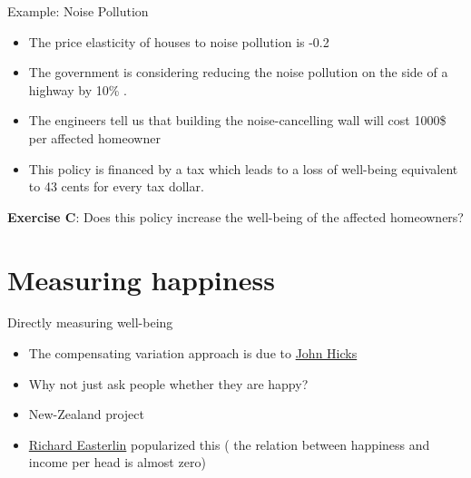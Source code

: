 \documentclass[handout]{beamer}
\begin{document}
\begin{frame}{Example: Noise Pollution}

\begin{itemize}
	\item The price elasticity of houses to noise pollution is -0.2
	\item The government is considering reducing the noise pollution on the side of a highway by 10\% .
	\item The engineers tell us that building the noise-cancelling wall will cost 1000\$ per affected homeowner
	\item This policy is financed by a tax which leads to a loss of well-being equivalent to 43 cents for every tax dollar. 
\end{itemize}
	
\textbf{Exercise C}: Does this policy increase the well-being of the affected homeowners?
\end{frame}

\section{Measuring happiness}

\begin{frame}{Directly measuring well-being}

\begin{itemize}
\item The compensating variation approach is due to \href{https://fr.wikipedia.org/wiki/John_Hicks}{John Hicks}
\item Why not just ask people whether they are happy?
\item New-Zealand project
\item \href{https://fr.wikipedia.org/wiki/Richard_Easterlin}{Richard Easterlin} popularized this ( the relation between happiness and income per head is almost zero)
\end{itemize}


\end{frame}
\end{document}
